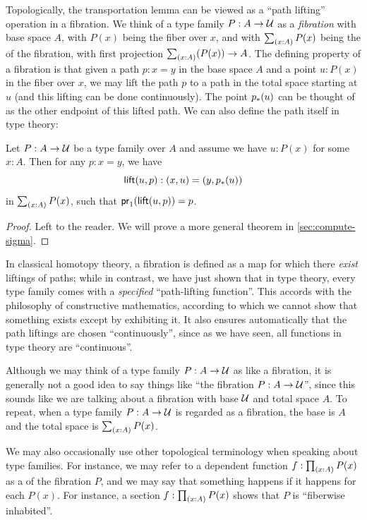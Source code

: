 Topologically, the transportation lemma can be viewed as a ``path lifting'' operation in a fibration.
%
%
We think of a type family $P:A\to \mathcal{U}$ as a \emph{fibration} with base space $A$, with $P(x)$ being the fiber over $x$, and with $\sm{x:A}P(x)$ being the  of the fibration, with first projection $\sm{x:A}(P(x))\to A$.
The defining property of a fibration is that given a path $p:x=y$ in the base space $A$ and a point $u:P(x)$ in the fiber over $x$, we may lift the path $p$ to a path in the total space starting at $u$ (and this lifting can be done continuously).
The point ${p}_{*}\mathopen{}\left({u}\right)\mathclose{}$ can be thought of as the other endpoint of this lifted path.
We can also define the path itself in type theory:

\begin{lem}\label{thm:path-lifting}
  Let $P:A\to\mathcal{U}$ be a type family over $A$ and assume we have $u:P(x)$ for some $x:A$.
  Then for any $p:x=y$, we have
  \begin{equation*}
    \mathsf{lift}(u,p):(x,u)=(y,{p}_{*}\mathopen{}\left({u}\right)\mathclose{})
  \end{equation*}
  in $\sm{x:A}P(x)$, such that ${\mathsf{pr}_{1}}\mathopen{}\left({\mathsf{lift}(u,p)}\right)\mathclose{} = p$.
\end{lem}
\begin{proof}
  Left to the reader.
  We will prove a more general theorem in \cref{sec:compute-sigma}.
\end{proof}

In classical homotopy theory, a fibration is defined as a map for which there \emph{exist} liftings of paths; while in contrast, we have just shown that in type theory, every type family comes with a \emph{specified} ``path-lifting function''.
This accords with the philosophy of constructive mathematics, according to which we cannot show that something exists except by exhibiting it.
%
It also ensures automatically that the path liftings are chosen ``continuously'', since as we have seen, all functions in type theory are ``continuous''.

\begin{rmk}
  Although we may think of a type family $P:A\to \mathcal{U}$ as like a fibration, it is generally not a good idea to say things like ``the fibration $P:A\to\mathcal{U}$'', since this sounds like we are talking about a fibration with base $\mathcal{U}$ and total space $A$.
  To repeat, when a type family $P:A\to \mathcal{U}$ is regarded as a fibration, the base is $A$ and the total space is $\sm{x:A} P(x)$.

  We may also occasionally use other topological terminology when speaking about type families.
  For instance, we may refer to a dependent function $f:\prd{x:A} P(x)$ as a 
  of the fibration $P$, and we may say that something happens 
  if it happens for each $P(x)$.
  For instance, a section $f:\prd{x:A} P(x)$ shows that $P$ is ``fiberwise inhabited''.
\end{rmk}

